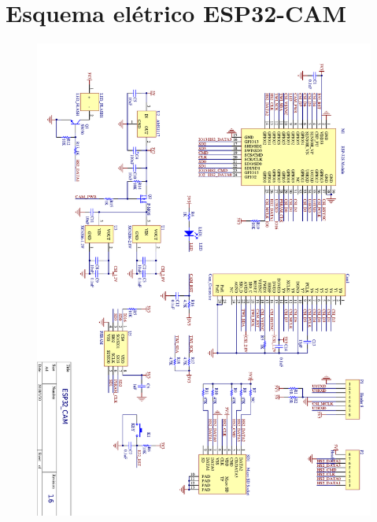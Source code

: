 
\chapter{Esquema elétrico ESP32-CAM}\label{cap:apendiceb}

\begin{figure}[h!]
    \centering
    \includegraphics[scale=0.77]{figuras/esquema_esp32_cam.pdf}
\end{figure}